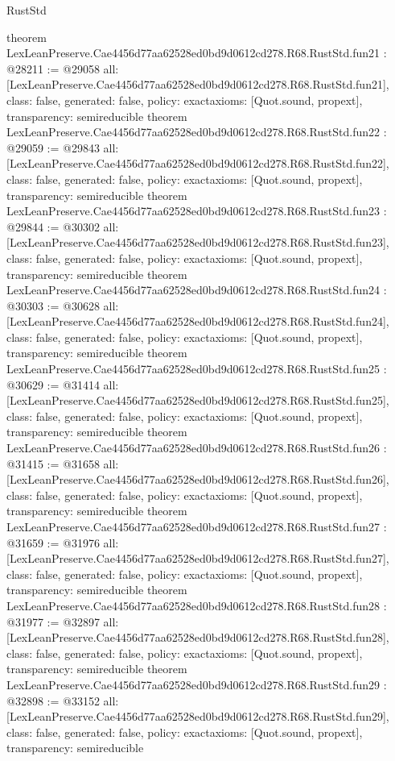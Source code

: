 \begin{lexlean}{RustStd}
\begin{coremodule}
{}
theorem LexLeanPreserve.Cae4456d77aa62528ed0bd9d0612cd278.R68.RustStd.fun21 : @28211 := @29058 {
  all: [LexLeanPreserve.Cae4456d77aa62528ed0bd9d0612cd278.R68.RustStd.fun21],
  class: false,
  generated: false,
  policy: exact{axioms: [Quot.sound, propext]},
  transparency: semireducible
}
theorem LexLeanPreserve.Cae4456d77aa62528ed0bd9d0612cd278.R68.RustStd.fun22 : @29059 := @29843 {
  all: [LexLeanPreserve.Cae4456d77aa62528ed0bd9d0612cd278.R68.RustStd.fun22],
  class: false,
  generated: false,
  policy: exact{axioms: [Quot.sound, propext]},
  transparency: semireducible
}
theorem LexLeanPreserve.Cae4456d77aa62528ed0bd9d0612cd278.R68.RustStd.fun23 : @29844 := @30302 {
  all: [LexLeanPreserve.Cae4456d77aa62528ed0bd9d0612cd278.R68.RustStd.fun23],
  class: false,
  generated: false,
  policy: exact{axioms: [Quot.sound, propext]},
  transparency: semireducible
}
theorem LexLeanPreserve.Cae4456d77aa62528ed0bd9d0612cd278.R68.RustStd.fun24 : @30303 := @30628 {
  all: [LexLeanPreserve.Cae4456d77aa62528ed0bd9d0612cd278.R68.RustStd.fun24],
  class: false,
  generated: false,
  policy: exact{axioms: [Quot.sound, propext]},
  transparency: semireducible
}
theorem LexLeanPreserve.Cae4456d77aa62528ed0bd9d0612cd278.R68.RustStd.fun25 : @30629 := @31414 {
  all: [LexLeanPreserve.Cae4456d77aa62528ed0bd9d0612cd278.R68.RustStd.fun25],
  class: false,
  generated: false,
  policy: exact{axioms: [Quot.sound, propext]},
  transparency: semireducible
}
theorem LexLeanPreserve.Cae4456d77aa62528ed0bd9d0612cd278.R68.RustStd.fun26 : @31415 := @31658 {
  all: [LexLeanPreserve.Cae4456d77aa62528ed0bd9d0612cd278.R68.RustStd.fun26],
  class: false,
  generated: false,
  policy: exact{axioms: [Quot.sound, propext]},
  transparency: semireducible
}
theorem LexLeanPreserve.Cae4456d77aa62528ed0bd9d0612cd278.R68.RustStd.fun27 : @31659 := @31976 {
  all: [LexLeanPreserve.Cae4456d77aa62528ed0bd9d0612cd278.R68.RustStd.fun27],
  class: false,
  generated: false,
  policy: exact{axioms: [Quot.sound, propext]},
  transparency: semireducible
}
theorem LexLeanPreserve.Cae4456d77aa62528ed0bd9d0612cd278.R68.RustStd.fun28 : @31977 := @32897 {
  all: [LexLeanPreserve.Cae4456d77aa62528ed0bd9d0612cd278.R68.RustStd.fun28],
  class: false,
  generated: false,
  policy: exact{axioms: [Quot.sound, propext]},
  transparency: semireducible
}
theorem LexLeanPreserve.Cae4456d77aa62528ed0bd9d0612cd278.R68.RustStd.fun29 : @32898 := @33152 {
  all: [LexLeanPreserve.Cae4456d77aa62528ed0bd9d0612cd278.R68.RustStd.fun29],
  class: false,
  generated: false,
  policy: exact{axioms: [Quot.sound, propext]},
  transparency: semireducible
}
\end{coremodule}
\end{lexlean}
